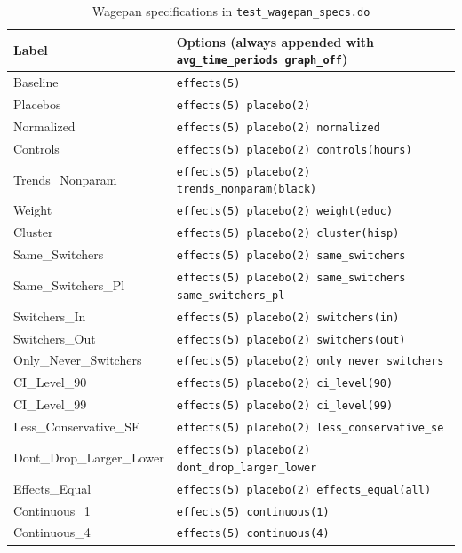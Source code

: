 \documentclass[11pt]{article}
\begin{document}
\begin{table}[ht]
\centering
\caption{Wagepan specifications in \texttt{test\_wagepan\_specs.do}}
\label{tab:specs}
\renewcommand{\arraystretch}{1.2}
\begin{tabular}{@{}lp{9cm}@{}}
\toprule
Label & Options (always appended with \texttt{avg\_time\_periods graph\_off}) \\
\midrule
Baseline               & \texttt{effects(5)} \\
Placebos               & \texttt{effects(5) placebo(2)} \\
Normalized             & \texttt{effects(5) placebo(2) normalized} \\
Controls               & \texttt{effects(5) placebo(2) controls(hours)} \\
Trends\_Nonparam       & \texttt{effects(5) placebo(2) trends\_nonparam(black)} \\
Weight                 & \texttt{effects(5) placebo(2) weight(educ)} \\
Cluster                & \texttt{effects(5) placebo(2) cluster(hisp)} \\
Same\_Switchers        & \texttt{effects(5) placebo(2) same\_switchers} \\
Same\_Switchers\_Pl    & \texttt{effects(5) placebo(2) same\_switchers same\_switchers\_pl} \\
Switchers\_In          & \texttt{effects(5) placebo(2) switchers(in)} \\
Switchers\_Out         & \texttt{effects(5) placebo(2) switchers(out)} \\
Only\_Never\_Switchers & \texttt{effects(5) placebo(2) only\_never\_switchers} \\
CI\_Level\_90          & \texttt{effects(5) placebo(2) ci\_level(90)} \\
CI\_Level\_99          & \texttt{effects(5) placebo(2) ci\_level(99)} \\
Less\_Conservative\_SE & \texttt{effects(5) placebo(2) less\_conservative\_se} \\
Dont\_Drop\_Larger\_Lower & \texttt{effects(5) placebo(2) dont\_drop\_larger\_lower} \\
Effects\_Equal         & \texttt{effects(5) placebo(2) effects\_equal(all)} \\
Continuous\_1          & \texttt{effects(5) continuous(1)} \\
Continuous\_4          & \texttt{effects(5) continuous(4)} \\
\bottomrule
\end{tabular}
\end{table}
\end{document}

